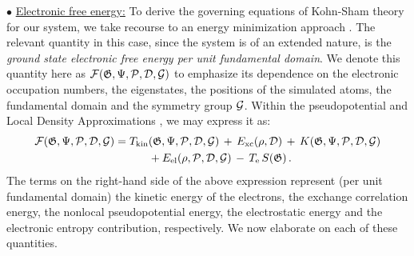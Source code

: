 \documentclass[preprint,12pt, 3p, sort&compress]{elsarticle}
\begin{document}
$\bullet$ \underline{Electronic free energy:} To derive the governing equations of Kohn-Sham theory for our system, we take recourse to an energy minimization approach \citep{banerjee2021ab, ghosh2019symmetry, ghosh2017sparc_2}. The relevant quantity in this case, since the system is of an extended nature, is the \textit{ground state electronic free energy per unit fundamental domain}. We denote this quantity here as  ${\cal F}(\mathfrak{G}, \Psi, {\cal P}, {\cal D}, {\cal G})$ to emphasize its dependence on the electronic occupation numbers, the eigenstates, the positions of the simulated atoms, the fundamental domain and the symmetry group ${\cal G}$. Within the pseudopotential \citep{troullier1991efficient, chelikowsky2019introductory} and Local Density Approximations \citep{KohnSham_DFT}, we may express it as:
\begin{align}
\nonumber
{\cal F}(\mathfrak{G}, \Psi, {\cal P}, {\cal D}, {\cal G}) = T_{\text{kin}}&(\mathfrak{G}, \Psi, {\cal P}, {\cal D}, {\cal G}) \,+\,E_{\text{xc}}(\rho, {\cal D})\,+\,K(\mathfrak{G}, \Psi, {\cal P}, {\cal D}, {\cal G})\\
&+ E_{\text{el}}(\rho, {\cal P}, {\cal D}, {\cal G})\,-\,T_{\text{e}}\,S(\mathfrak{G})\,.
\label{eq:electronic_free_energy}
\end{align}
The terms on the right-hand side of the above expression represent (per unit fundamental domain) the kinetic energy of the electrons, the exchange correlation energy, the nonlocal pseudopotential energy, the electrostatic energy and the electronic entropy contribution, respectively. We now elaborate on each of these quantities.
\end{document}
